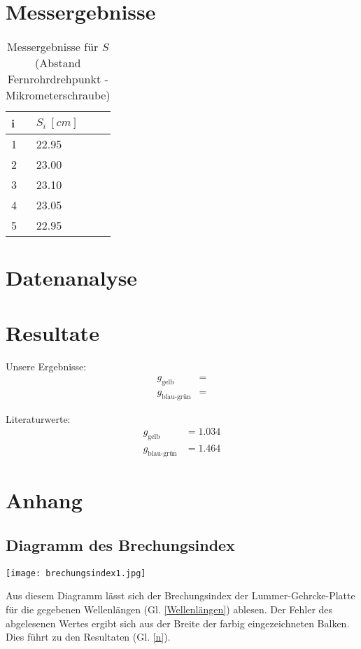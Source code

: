 \documentclass[12pt,a4paper]{article} %
\begin{document}
\newpage
\section{Messergebnisse}

\begin{table}[h] \begin{center}
		\begin{tabular}{|ll|} \hline
			i & $S_{i} \ [cm]$  \\ \hline
			1&  22.95\\ 
			2&  23.00\\ 
			3&  23.10\\ 
			4&  23.05\\   
			5&  22.95\\ \hline
	\end{tabular} \end{center}
	\caption{Messergebnisse für $S$ (Abstand Fernrohrdrehpunkt - Mikrometerschraube)}
\end{table}



\newpage
\section{Datenanalyse}

\newpage
\section{Resultate}

Unsere Ergebnisse:
\begin{align*}
g_{\text{gelb}} &=  \\
g_{\text{blau-grün}} &= 
\end{align*}

Literaturwerte:
\begin{align*}
g_{\text{gelb}} &= 1.034 \\
g_{\text{blau-grün}} &= 1.464
\end{align*}

\newpage
\section{Anhang}
\subsection{Diagramm des Brechungsindex}\label{Diagramm}
\begin{center} \texttt{[image: brechungsindex1.jpg]} \end{center}
Aus diesem Diagramm lässt sich der Brechungsindex der Lummer-Gehrcke-Platte für die gegebenen Wellenlängen (Gl. \ref{Wellenlängen}) ablesen. Der Fehler des abgelesenen Wertes ergibt sich aus der Breite der farbig eingezeichneten Balken. Dies führt zu den Resultaten (Gl. \ref{n}).
\end{document}
